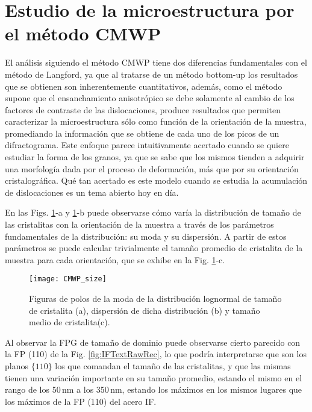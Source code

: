 \section{Estudio de la microestructura por el método CMWP}\label{S:IFCMWP}
El análisis siguiendo el método CMWP tiene dos diferencias fundamentales con el método de Langford, ya que al tratarse de un método bottom-up los resultados que se obtienen son inherentemente cuantitativos, además, como el método supone que el ensanchamiento anisotrópico se debe solamente al cambio de los factores de contraste de las dislocaciones, produce resultados que permiten caracterizar la microestructura sólo como función de la orientación de la muestra, promediando la información que se obtiene de cada uno de los picos de un difractograma. 
Este enfoque parece intuitivamente acertado cuando se quiere estudiar la forma de los granos, ya que se sabe que los mismos tienden a adquirir una morfología dada por el proceso de deformación, más que por su orientación cristalográfica.
Qué tan acertado es este modelo cuando se estudia la acumulación de dislocaciones es un tema abierto hoy en día.

En las Figs. \ref{fig:IFCMWPSize}-a y \ref{fig:IFCMWPSize}-b puede observarse cómo varía la distribución de tamaño de las cristalitas con la orientación de la muestra a través de los parámetros fundamentales de la distribución: su moda y su dispersión.
A partir de estos parámetros se puede calcular trivialmente el tamaño promedio de cristalita de la muestra para cada orientación, que se exhibe en la Fig. \ref{fig:IFCMWPSize}-c.

\begin{figure}[!htb]
  \centering
  \texttt{[image: CMWP\_size]}
  \caption{Figuras de polos de la moda de la distribución lognormal de tamaño de cristalita (a), dispersión de dicha distribución (b) y tamaño medio de cristalita(c).}
  \label{fig:IFCMWPSize}
\end{figure}

Al observar la FPG de tamaño de dominio puede observarse cierto parecido con la FP (110) de la Fig. \ref{fig:IFTextRawRec}, lo que podría interpretarse que son los planos $\{110\}$ los que comandan el tamaño de las cristalitas, y que las mismas tienen una variación importante en su tamaño promedio, estando el mismo en el rango de los 50\,nm a los 350\,nm, estando los máximos en los mismos lugares que los máximos de la FP (110) del acero IF.

